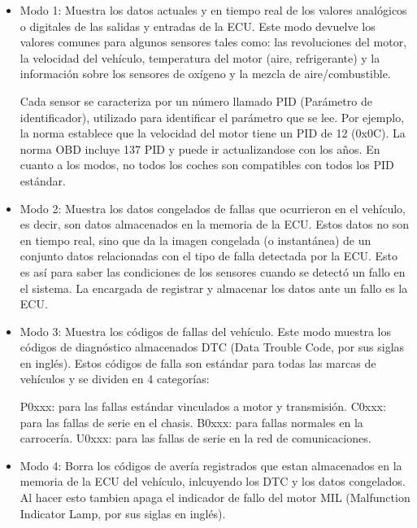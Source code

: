 \begin{itemize}


\item  Modo 1:  Muestra los datos actuales y en tiempo real de los valores analógicos o digitales de las salidas y entradas de la ECU. Este modo devuelve los valores comunes para algunos sensores tales como: las revoluciones del motor, la velocidad del vehículo, temperatura del motor (aire, refrigerante) y la información sobre los sensores de oxígeno y la mezcla de aire/combustible.

Cada sensor se caracteriza por un número llamado PID (Parámetro de identificador), utilizado para identificar el parámetro que se lee. Por ejemplo, la norma establece que la velocidad del motor tiene un PID de 12 (0x0C). La norma OBD incluye 137 PID y puede ir actualizandose con los años. En cuanto a los modos, no todos los coches son compatibles con todos los PID estándar. 

\item Modo 2: Muestra los datos congelados de fallas que ocurrieron en el vehículo, es decir, son datos almacenados en la memoria de la ECU. Estos datos no son en tiempo real, sino que da la imagen congelada (o instantánea) de un conjunto datos relacionadas con el tipo de falla detectada por la ECU. Esto es así para saber las condiciones de los sensores cuando se detectó un fallo en el sistema. La encargada de registrar y almacenar los datos ante un fallo es la ECU. 

\item Modo 3: Muestra los códigos de fallas del vehículo.
Este modo muestra los códigos de diagnóstico almacenados DTC (Data Trouble Code, por sus siglas en inglés). Estos códigos de falla son estándar para todas las marcas de vehículos y se dividen en 4 categorías:
    


     \subitem P0xxx: para las fallas estándar vinculados a motor y transmisión.
  	 \subitem C0xxx: para las fallas de serie en el chasis.
     \subitem B0xxx: para fallas normales en la carrocería.
     \subitem U0xxx: para las fallas de serie en la red de comunicaciones.
     
\item Modo 4: Borra los códigos de avería registrados que estan almacenados en la memoria de la ECU del vehículo, inlcuyendo los DTC y los datos congelados. Al hacer esto tambien apaga el indicador de fallo del motor MIL (Malfunction Indicator Lamp, por sus siglas en inglés).


\end{itemize}
